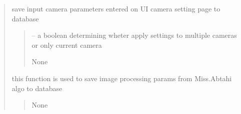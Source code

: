 \documentclass[letterpaper,10pt,english]{sphinxmanual}
\begin{document}
\begin{quote}
\begin{savenotes}
\begin{fulllineitems}
\begin{savenotes}
\begin{fulllineitems}
\begin{quote}
\begin{description}
\end{description}\end{quote}

\end{fulllineitems}\end{savenotes}


\begin{savenotes}\begin{fulllineitems}
\label{\detokenize{setting/setting_api:oxin.setting_api.API.save_changed_camera_params}}
\pysigstartsignatures
{}
\pysigstopsignatures
\sphinxAtStartPar
save input camera parameters entered on UI camera setting page to database
\begin{quote}\begin{description}
\sphinxAtStartPar
{} – a boolean determining wheter apply settings to multiple cameras or only current camera

\sphinxAtStartPar
None

\end{description}\end{quote}

\end{fulllineitems}\end{savenotes}


\begin{savenotes}\begin{fulllineitems}
\label{\detokenize{setting/setting_api:oxin.setting_api.API.save_image_processing_parms}}
\pysigstartsignatures
{}
\pysigstopsignatures
\sphinxAtStartPar
this function is used to save image processing params from Miss.Abtahi algo to database
\begin{quote}\begin{description}
\sphinxAtStartPar
None


\end{description}
\end{quote}
\end{fulllineitems}
\end{savenotes}
\end{fulllineitems}
\end{savenotes}
\end{quote}
\end{document}
